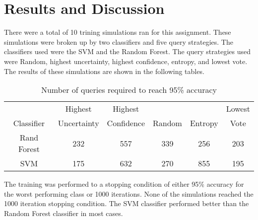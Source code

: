 
\section{Results and Discussion}

There were a total of 10 trining simulations ran for this assignment. These simulations were broken up by two classifiers and five query strategies.
 The classifiers used were the SVM and the Random Forest. The query strategies used were Random, highest uncertainty, highest confidence, entropy, and lowest vote. 
 The results of these simulations are shown in the following tables.

\begin{table}[htbp]
\centering
\begin{tabular}{|c|c|c|c|c|c|}
\hline
~& Highest & Highest &~&~&Lowest \\
Classifier & Uncertainty & Confidence & Random & Entropy & Vote  \\\hline
Rand Forest & 232 & 557 & 339 & 256 & 203 \\ \hline
SVM & 175 & 632 & 270 & 855 & 195 \\ \hline
\end{tabular}
\caption{Number of queries required to reach 95\% accuracy}
\end{table}

The training was performed to a stopping condition of either 95\% accuracy for the worst performing class or 1000 iterations.
None of the simulations reached the 1000 iteration stopping condition. The SVM classifier performed better than the Random Forest classifier in most cases.
